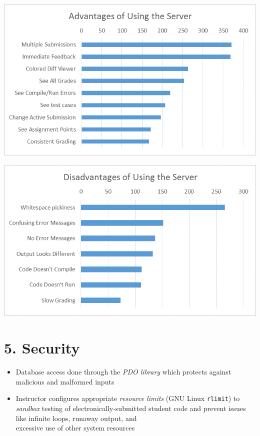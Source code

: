 \documentclass[thesis]{hmcposter}
\begin{document}
\begin{poster}
\begin{center}
\includegraphics[width=11in]{Advantages}
\label{fig:advantages}

\vspace{0.1in}

\includegraphics[width=11in]{Disadvantages}
\label{fig:disadvantages}
\end{center}

\vspace{-0.2in}

\section{5. Security}
    \begin{itemize}
        \item Database access done through the \textit{PDO library} which protects against malicious and malformed inputs
        \item 

Instructor configures appropriate \textit{resource limits} (GNU Linux {\tt rlimit}) to
{\em sandbox} testing of electronically-submitted student code and prevent issues like infinite loops, runaway output, and \\ excessive use of other system resources 


\end{itemize}
\end{poster}
\end{document}
